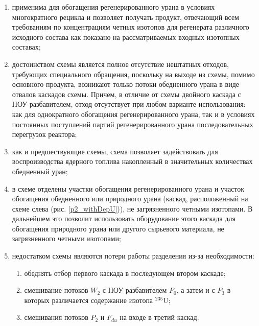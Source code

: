 \begin{enumerate}
    \item применима для обогащения регенерированного урана в условиях многократного рецикла и позволяет получать продукт, отвечающий всем требованиям по концентрациям четных изотопов для регенерата различного исходного состава как показано на рассматриваемых входных изотопных составах;
    \item достоинством схемы является полное отсутствие нештатных отходов, требующих специального обращения, поскольку на выходе из схемы, помимо основного продукта, возникают только потоки обедненного урана в виде отвалов каскадов схемы. Причем, в отличие от схемы двойного каскада с НОУ-разбавителем, отход отсутствует при любом варианте использования: как для однократного обогащения регенерированного урана, так и в условиях постоянных поступлений партий регенерированного урана последовательных перегрузок реактора;
    \item как и предшествующие схемы, схема позволяет задействовать для воспроизводства ядерного топлива накопленный в значительных количествах обедненный уран;
    \item в схеме отделены участки обогащения регенерированного урана и участок обогащения обедненного или природного урана (каскад, расположенный на схеме слева (рис. 
    \ref{p2_withDepU})), не загрязненного четными изотопами. В дальнейшем это позволит использовать оборудование этого каскада для обогащения природного урана или другого сырьевого материала, не загрязненного четными изотопами;
    \item недостатком схемы являются потери работы разделения из-за необходимости:
    \begin{enumerate}
        \item обеднять отбор первого каскада в последующем втором каскаде;
        \item смешивание потоков $W_2$ с НОУ-разбавителем $P_0$, а затем и с $P_3$ в которых различается содержание изотопа $^{235}$U;
        \item смешивания потоков $P_2$ и $F_{du}$ на входе в третий каскад.
    \end{enumerate}
\end{enumerate}


